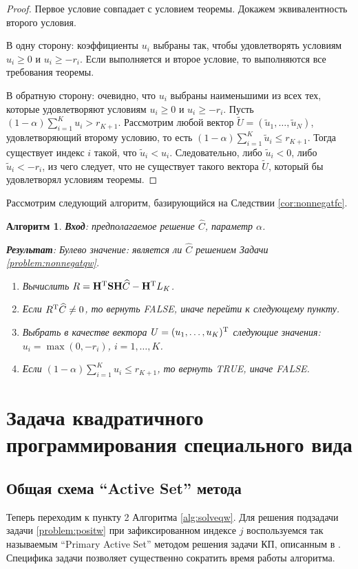 \documentclass[10pt]{article}
\newtheorem{algorithm}{Алгоритм}
\begin{document}
\begin{proof}
Первое условие совпадает с условием теоремы. Докажем эквивалентность второго условия.

В одну сторону: коэффициенты $u_i$ выбраны так, чтобы удовлетворять условиям $u_i \ge 0$ и $u_i \ge -r_i$. Если выполняется и второе условие, то выполняются все требования теоремы.

В обратную сторону: очевидно, что $u_i$ выбраны наименьшими из всех тех, которые удовлетворяют условиям $u_i \ge 0$ и $u_i \ge -r_i$. Пусть $(1 - \alpha) \sum_{i=1}^K u_i > r_{K+1}$. Рассмотрим любой вектор $\widetilde U = (\tilde u_1, \ldots, \tilde u_N)$, удовлетворяющий второму условию, то есть $(1 - \alpha) \sum_{i=1}^K \tilde u_i \le r_{K+1}$. Тогда существует индекс $i$ такой, что $\tilde u_i < u_i$. Следовательно, либо $\tilde u_i < 0$, либо $\tilde u_i < -r_i$, из чего следует, что не существует такого вектора $\widetilde U$, который бы удовлетворял условиям теоремы.
\end{proof}

Рассмотрим следующий алгоритм, базирующийся на Следствии \ref{cor:nonnegatfc}.
\begin{algorithm}
	\label{alg:nonnegatfc}
	\textbf{Вход}: предполагаемое решение $\widehat C$, параметр $\alpha$.
	
	\textbf{Результат}:
	Булево значение: является ли $\widehat C$ решением Задачи \ref{problem:nonnegatqw}.
	
	\begin{enumerate}
		\item Вычислить $R = \mathbf{H}^{\mathrm{T}} \mathbf{S} \mathbf{H} \widehat C - \mathbf{H}^{\mathrm{T}} L_K$.
		\item Если $R^{\mathrm{T}} \widehat C \neq 0$, то вернуть FALSE, иначе перейти к следующему пункту.
		\item Выбрать в качестве вектора $U = (u_1, \ldots, u_K)^{\mathrm{T}}$ следующие значения: $u_i = \max(0, -r_i)$, $i = 1, \ldots, K$.
		\item Если $(1 - \alpha) \sum_{i=1}^K u_i \le r_{K+1}$, то вернуть TRUE, иначе FALSE.
	\end{enumerate}
\end{algorithm}

\section{Задача квадратичного программирования специального вида} \label{subsect:qp}
\subsection{Общая схема ``Active Set'' метода}
Теперь переходим к пункту 2 Алгоритма \ref{alg:solveqw}. Для решения подзадачи задачи \ref{problem:positw} при зафиксированном индексе $j$ воспользуемся так называемым ``Primary Active Set'' методом решения задачи КП, описанным в \cite{nocedal2006numerical}. Специфика задачи позволяет существенно сократить время работы алгоритма.
\end{document}
